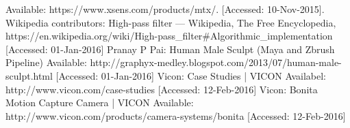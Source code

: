 \documentclass[9pt]{llncs}
\begin{document}
\begin{thebibliography}{9}
	Available: https://www.xsens.com/products/mtx/. [Accessed: 10-Nov-2015].
	Wikipedia contributors:
	High-pass filter --- Wikipedia, The Free Encyclopedia,
	https://en.wikipedia.org/wiki/High-pass\_filter\#Algorithmic\_implementation [Accessed: 01-Jan-2016]
	Pranay P Pai: 
	Human Male Sculpt (Maya and Zbrush Pipeline) 
	Available: http://graphyx-medley.blogspot.com/2013/07/human-male-sculpt.html [Accessed: 01-Jan-2016]
	Vicon:
	Case Studies | VICON
	Availabel: http://www.vicon.com/case-studies [Accessed: 12-Feb-2016]
	Vicon:
	Bonita Motion Capture Camera  | VICON
	Available: http://www.vicon.com/products/camera-systems/bonita [Accessed: 12-Feb-2016]
	
\end{thebibliography}
\end{document}
